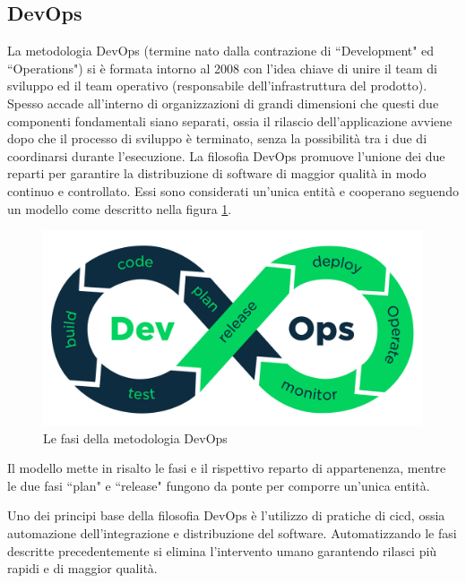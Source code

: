 \subsection{DevOps}
La metodologia DevOps (termine nato dalla contrazione di ``Development" ed ``Operations") si è formata intorno al 2008 con l'idea chiave di unire il team di sviluppo ed il team operativo (responsabile dell'infrastruttura del prodotto). Spesso accade all'interno di organizzazioni di grandi dimensioni che questi due componenti fondamentali siano separati, ossia il rilascio dell'applicazione avviene dopo che il processo di sviluppo è terminato, senza la possibilità tra i due di coordinarsi durante l'esecuzione. La filosofia DevOps promuove l'unione dei due reparti per garantire la distribuzione di software di maggior qualità in modo continuo e controllato. Essi sono considerati un'unica entità e cooperano seguendo un modello come descritto nella figura \ref{fig:devops-process}.
\begin{figure}[htb]
	\centering
	\includegraphics[width=.9\linewidth]{figures/devops-process.png}
	\caption{Le fasi della metodologia DevOps}
	\label{fig:devops-process}
\end{figure}
Il modello mette in risalto le fasi e il rispettivo reparto di appartenenza, mentre le due fasi ``plan" e ``release" fungono da ponte per comporre un'unica entità.

Uno dei principi base della filosofia DevOps è l'utilizzo di pratiche di \ac{cicd}, ossia automazione dell'integrazione e distribuzione del software. Automatizzando le fasi descritte precedentemente si elimina l'intervento umano garantendo rilasci più rapidi e di maggior qualità.


